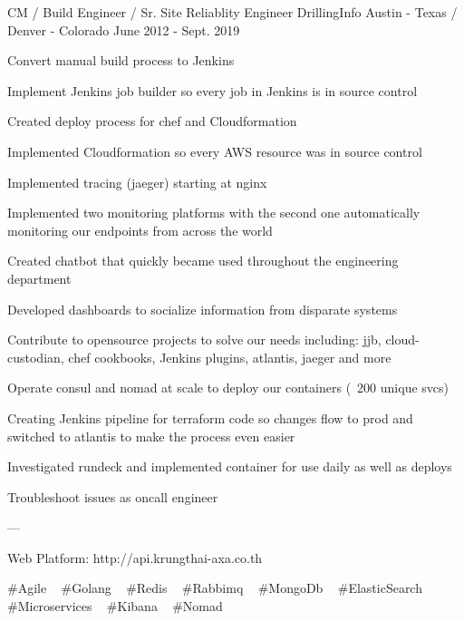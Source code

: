 \begin{cventries}
  \cventry
    {CM / Build Engineer / Sr. Site Reliablity Engineer} %
    {DrillingInfo} %
    {Austin - Texas / Denver - Colorado} %
    {June 2012 - Sept. 2019} %
    {
      \begin{cvitems} %
        \item {Convert manual build process to Jenkins}
        \item {Implement Jenkins job builder so every job in Jenkins is in source control}
        \item {Created deploy process for chef and Cloudformation}
        \item {Implemented Cloudformation so every AWS resource was in source control}
        \item {Implemented tracing (jaeger) starting at nginx}
        \item {Implemented two monitoring platforms with the second one automatically monitoring our endpoints from across the world}
        \item {Created chatbot that quickly became used throughout the engineering department}
        \item {Developed dashboards to socialize information from disparate systems}
        \item {Contribute to opensource projects to solve our needs including: jjb, cloud- custodian, chef cookbooks, Jenkins plugins, atlantis, jaeger and more}
        \item {Operate consul and nomad at scale to deploy our containers (~200 unique svcs)}
        \item {Creating Jenkins pipeline for terraform code so changes flow to prod and switched to atlantis to make the process even easier}
        \item {Investigated rundeck and implemented container for use daily as well as deploys}
        \item {Troubleshoot issues as oncall engineer}
        \item {---}
        \item {Web Platform: http://api.krungthai-axa.co.th}
      \end{cvitems}
    }
    {
      \#Agile ~
      \#Golang ~
      \#Redis ~
      \#Rabbimq ~
      \#MongoDb ~
      \#ElasticSearch ~
      \#Microservices ~
      \#Kibana ~
      \#Nomad ~
    }


\end{cventries}
